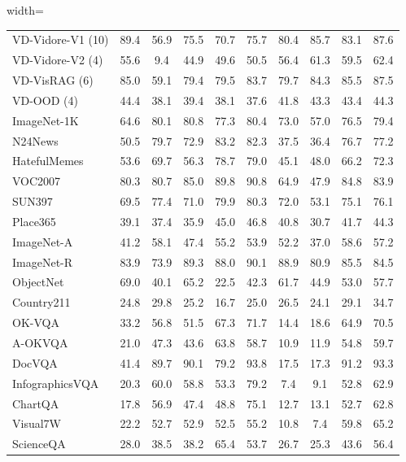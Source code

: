 \begin{table}[!t]
\begin{adjustbox}{width=\textwidth}
\begin{tabular}{l|ccccccccc}
        VD-Vidore-V1 (10) & 89.4 & 56.9 & 75.5 & 70.7 & 75.7 & 80.4 & 85.7 & 83.1 & 87.6 \\
        \rowcolor{vdcatcolor}
        VD-Vidore-V2 (4) & 55.6 & 9.4 & 44.9 & 49.6 & 50.5 & 56.4 & 61.3 & 59.5 & 62.4 \\
        \rowcolor{vdcatcolor}
        VD-VisRAG (6) & 85.0 & 59.1 & 79.4 & 79.5 & 83.7 & 79.7 & 84.3 & 85.5 & 87.5 \\
        \rowcolor{vdcatcolor}
        VD-OOD (4) & 44.4 & 38.1 & 39.4 & 38.1 & 37.6 & 41.8 & 43.3 & 43.4 & 44.3 \\
        \midrule
        ImageNet-1K & 64.6 & 80.1 & 80.8 & 77.3 & 80.4 & 73.0 & 57.0 & 76.5 & 79.4 \\
        N24News & 50.5 & 79.7 & 72.9 & 83.2 & 82.3 & 37.5 & 36.4 & 76.7 & 77.2 \\
        HatefulMemes & 53.6 & 69.7 & 56.3 & 78.7 & 79.0 & 45.1 & 48.0 & 66.2 & 72.3 \\
        VOC2007 & 80.3 & 80.7 & 85.0 & 89.8 & 90.8 & 64.9 & 47.9 & 84.8 & 83.9 \\
        SUN397 & 69.5 & 77.4 & 71.0 & 79.9 & 80.3 & 72.0 & 53.1 & 75.1 & 76.1 \\
        Place365 & 39.1 & 37.4 & 35.9 & 45.0 & 46.8 & 40.8 & 30.7 & 41.7 & 44.3 \\
        ImageNet-A & 41.2 & 58.1 & 47.4 & 55.2 & 53.9 & 52.2 & 37.0 & 58.6 & 57.2 \\
        ImageNet-R & 83.9 & 73.9 & 89.3 & 88.0 & 90.1 & 88.9 & 80.9 & 85.5 & 84.5 \\
        ObjectNet & 69.0 & 40.1 & 65.2 & 22.5 & 42.3 & 61.7 & 44.9 & 53.0 & 57.7 \\
        Country211 & 24.8 & 29.8 & 25.2 & 16.7 & 25.0 & 26.5 & 24.1 & 29.1 & 34.7 \\
        OK-VQA & 33.2 & 56.8 & 51.5 & 67.3 & 71.7 & 14.4 & 18.6 & 64.9 & 70.5 \\
        A-OKVQA & 21.0 & 47.3 & 43.6 & 63.8 & 58.7 & 10.9 & 11.9 & 54.8 & 59.7 \\
        DocVQA & 41.4 & 89.7 & 90.1 & 79.2 & 93.8 & 17.5 & 17.3 & 91.2 & 93.3 \\
        InfographicsVQA & 20.3 & 60.0 & 58.8 & 53.3 & 79.2 & 7.4 & 9.1 & 52.8 & 62.9 \\
        ChartQA & 17.8 & 56.9 & 47.4 & 48.8 & 75.1 & 12.7 & 13.1 & 52.7 & 62.8 \\
        Visual7W & 22.2 & 52.7 & 52.9 & 52.5 & 55.2 & 10.8 & 7.4 & 59.8 & 65.2 \\
        ScienceQA & 28.0 & 38.5 & 38.2 & 65.4 & 53.7 & 26.7 & 25.3 & 43.6 & 56.4 \\

\end{tabular}
\end{adjustbox}
\end{table}

